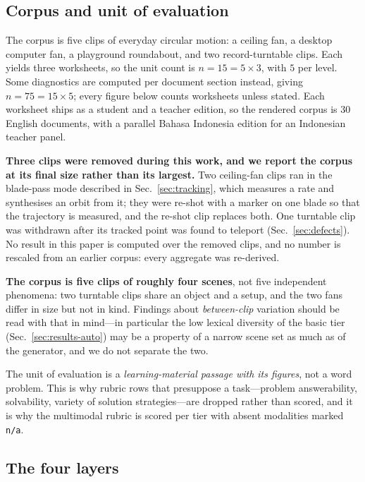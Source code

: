 \documentclass[conference]{IEEEtran}
\begin{document}
\subsection{Corpus and unit of evaluation}

The corpus is five clips of everyday circular motion: a ceiling fan, a desktop
computer fan, a playground roundabout, and two record-turntable clips. Each
yields three worksheets, so the unit count is $n = 15 = 5 \times 3$, with $5$
per level. Some diagnostics are computed per document section instead, giving
$n = 75 = 15 \times 5$; every figure below counts worksheets unless stated.
Each worksheet ships as a student and a teacher edition, so the rendered corpus
is $30$ English documents, with a parallel Bahasa Indonesia edition for an
Indonesian teacher panel.

\textbf{Three clips were removed during this work, and we report the corpus at
its final size rather than its largest.} Two ceiling-fan clips ran in the
blade-pass mode described in Sec.~\ref{sec:tracking}, which measures a rate and
synthesises an orbit from it; they were re-shot with a marker on one blade so
that the trajectory is measured, and the re-shot clip replaces both. One
turntable clip was withdrawn after its tracked point was found to teleport
(Sec.~\ref{sec:defects}). No result in this paper is computed over the removed
clips, and no number is rescaled from an earlier corpus: every aggregate was
re-derived.

\textbf{The corpus is five clips of roughly four scenes}, not five independent
phenomena: two turntable clips share an object and a setup, and the two fans
differ in size but not in kind. Findings about \emph{between-clip} variation
should be read with that in mind---in particular the low lexical diversity of
the basic tier (Sec.~\ref{sec:results-auto}) may be a property of a narrow
scene set as much as of the generator, and we do not separate the two.

The unit of evaluation is a \emph{learning-material passage with its figures},
not a word problem. This is why rubric rows that presuppose a task---problem
answerability, solvability, variety of solution strategies---are dropped rather
than scored, and it is why the multimodal rubric is scored per tier with
absent modalities marked \texttt{n/a}.

\subsection{The four layers}
\end{document}

